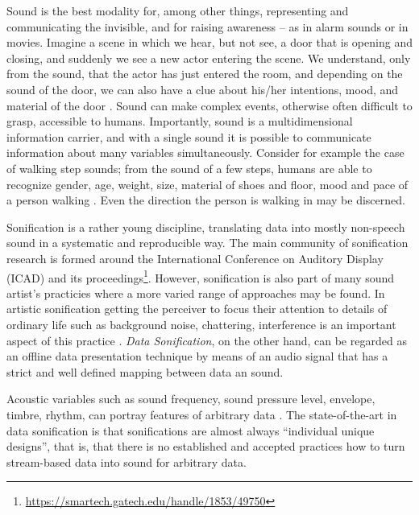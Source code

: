 \documentclass[manuscript,screen]{acmart}
\begin{document}
Sound is the best modality for, among other things, representing and communicating the invisible, and for raising awareness -- as in alarm sounds or in movies. Imagine a scene in which we hear, but not see, a door that is opening and closing, and suddenly we see a new actor entering the scene. We understand, only from the sound, that the actor has just entered the room, and depending on the sound of the door, we can also have a clue about his/her intentions, mood, and material of the door \cite{houel2020perception}. Sound can make complex events, otherwise often difficult to grasp, accessible to humans. Importantly, sound is a multidimensional information carrier, and with a single sound it is possible to communicate information about many variables simultaneously. Consider for example the case of walking step sounds; from the sound of a few steps, humans are able to recognize gender, age, weight, size, material of shoes and floor, mood and pace of a person walking \cite{visell2009sound,giordano2014production}. Even the direction the person is walking in may be discerned.

Sonification is a rather young discipline, translating data into mostly non-speech sound in a systematic and reproducible way. The main community of sonification research is formed around the International Conference on Auditory Display (ICAD) and its proceedings\footnote{\url{https://smartech.gatech.edu/handle/1853/49750}}. However, sonification is also part of many sound artist's practicies where a more varied range of approaches may be found. In artistic sonification getting the perceiver to focus their attention to details of ordinary life such as background noise, chattering, interference is an important aspect of this practice \cite{tittel2009sound}. \textit{Data Sonification}, on the other hand, can be regarded as an offline data presentation technique by means of an audio signal that has a strict and well defined mapping between data an sound.

Acoustic variables such as sound frequency, sound pressure level, envelope, timbre, rhythm, can portray features of arbitrary data \cite{dubus2013systematic}. The state-of-the-art in data sonification is that sonifications are almost always ``individual unique designs'', that is, that there is no established and accepted practices how to turn stream-based data into sound for arbitrary data.  
\end{document}
